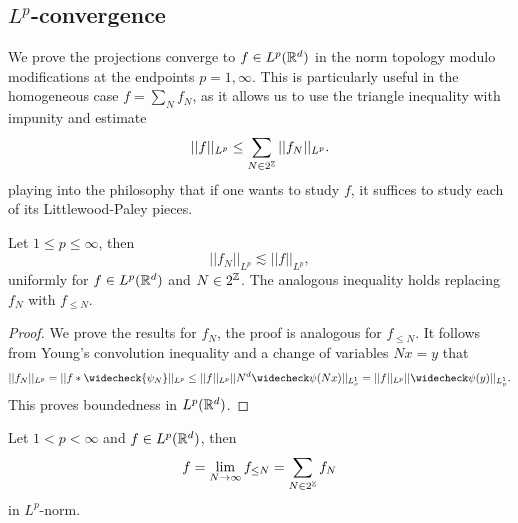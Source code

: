 \subsection{$L^p$-convergence}

We prove the projections converge to $f \in L^p (\mathbb R^d)$ in the norm topology modulo modifications at the endpoints $p = 1, \infty$. This is particularly useful in the homogeneous case $f = \sum_N f_N$, as it allows us to use the triangle inequality with impunity and estimate
	\[ ||f||_{L^p} \leq \sum_{N \in 2^\mathbb Z} ||f_N||_{L^p} .\]
playing into the philosophy that if one wants to study $f$, it suffices to study each of its Littlewood-Paley pieces. 

\begin{proposition}[$L^p$-boundedness]
	Let $1 \leq p \leq \infty$, then 
		\[||f_N||_{L^p}  \lesssim ||f||_{L^p},\]	
	uniformly for $f \in L^p (\mathbb R^d)$ and $N \in 2^\mathbb Z$. The analogous inequality holds replacing $f_N$ with $f_{\leq N}$. \label{prop:bounded}
\end{proposition}

\begin{proof}
	We prove the results for $f_N$, the proof is analogous for $f_{\leq N}$. It follows from Young's convolution inequality and a change of variables $Nx = y$ that 
		\[ ||f_N||_{L^p} = || f * \widecheck{\psi_N} ||_{L^p} \leq ||f||_{L^p} ||N^d \widecheck \psi (Nx)||_{L^1_x} = ||f||_{L^p} ||\widecheck \psi (y) ||_{L^1_y}. \] 
	This proves boundedness in $L^p (\mathbb R^d)$. 
\end{proof}

\begin{proposition}
	Let $1 < p < \infty$ and $f \in L^p (\mathbb R^d)$, then
		\[ f = \lim_{N \to \infty} f_{\leq N} = \sum_{N \in 2^\mathbb Z} f_N \]
	in $L^p$-norm. \label{prop:converge}
\end{proposition}

